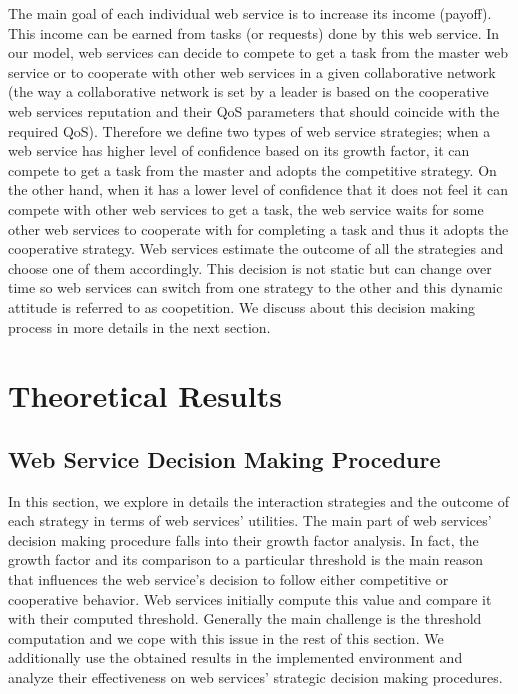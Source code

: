 \documentclass[runningheads,a4paper]{llncs}
\begin{document}
The main goal of each individual web service is to increase its
income (payoff). This income can be earned from tasks (or
requests) done by this web service. In our model, web services can
decide to compete to get a task from the master web service or to
cooperate with other web services in a given collaborative network
(the way a collaborative network is set by a leader is based on
the cooperative web services reputation and their QoS parameters
that should coincide with the required QoS). Therefore we define
two types of web service strategies; when a web service has higher
level of confidence based on its growth factor, it can compete to
get a task from the master and adopts the competitive strategy. On
the other hand, when it has a lower level of confidence that it
does not feel it can compete with other web services to get a
task, the web service waits for some other web services to
cooperate with for completing a task and thus it adopts the
cooperative strategy. Web services estimate the outcome of all the
strategies and choose one of them accordingly. This decision is
not static but can change over time so web services can switch
from one strategy to the other and this dynamic attitude is
referred to as coopetition. We discuss about this decision making
process in more details in the next section.








\section{Theoretical Results}\label{Theoretical Results}

\subsection{Web Service Decision Making Procedure}
In this section, we explore in details the interaction strategies
and the outcome of each strategy in terms of web services'
utilities. The main part of web services' decision making
procedure falls into their growth factor analysis. In fact, the
growth factor and its comparison to a particular threshold is the
main reason that influences the web service's decision to follow
either competitive or cooperative behavior. Web services initially
compute this value and compare it with their computed threshold.
Generally the main challenge is the threshold computation and we
cope with this issue in the rest of this section. We additionally
use the obtained results in the implemented environment and
analyze their effectiveness on web services' strategic decision
making procedures.
\end{document}
